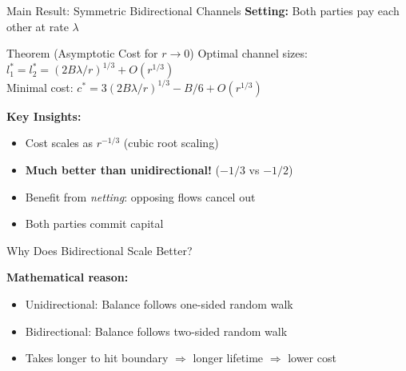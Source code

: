 \documentclass[aspectratio=169,12pt]{beamer}
\begin{document}
\begin{frame}{Main Result: Symmetric Bidirectional Channels}
\textbf{Setting:} Both parties pay each other at rate $\lambda$

\begin{block}{Theorem (Asymptotic Cost for $r \to 0$)}
Optimal channel sizes: $l_1^* = l_2^* = (2B\lambda/r)^{1/3} + O(r^{1/3})$ \\[0.2cm]
Minimal cost: $c^* = 3(2B\lambda/r)^{1/3} - B/6 + O(r^{1/3})$
\end{block}

\textbf{Key Insights:}
\begin{itemize}
    \item Cost scales as $\boxed{r^{-1/3}}$ (cubic root scaling)
    \item \textbf{Much better than unidirectional!} ($-1/3$ vs $-1/2$)
    \item Benefit from \textit{netting}: opposing flows cancel out
    \item Both parties commit capital
\end{itemize}

\end{frame}

\begin{frame}{Why Does Bidirectional Scale Better?}
\begin{center}
\end{center}

\textbf{Mathematical reason:}
\begin{itemize}
    \item Unidirectional: Balance follows one-sided random walk
    \item Bidirectional: Balance follows two-sided random walk
    \item Takes longer to hit boundary $\Rightarrow$ longer lifetime $\Rightarrow$ lower cost
\end{itemize}
\end{frame}
\end{document}
